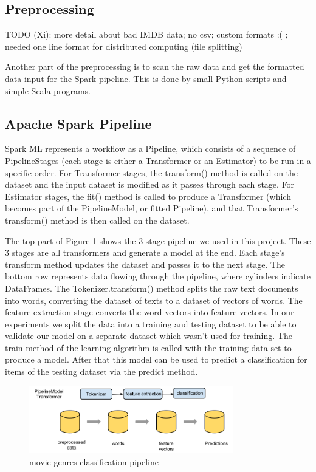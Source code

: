 \documentclass{vldb}
\begin{document}
\subsection{Preprocessing}
\par TODO (Xi): more detail about bad IMDB data; no csv; custom formats :( ; needed one line format for distributed computing (file splitting)
\par Another part of the preprocessing is to scan the raw data and get the formatted data input for the Spark pipeline. This is done by small Python scripts and simple Scala programs.


\subsection{Apache Spark Pipeline}
\par Spark ML\cite{sparkml} represents a workflow as a Pipeline, which consists of a sequence of PipelineStages (each stage is either a Transformer or an Estimator) to be run in a specific order. For Transformer stages, the transform() method is called on the dataset and the input dataset is modified as it passes through each stage. For Estimator stages, the fit() method is called to produce a Transformer (which becomes part of the PipelineModel, or fitted Pipeline), and that Transformer's transform() method is then called on the dataset.
\par The top part of Figure \ref{fig:pipeline} shows the 3-stage pipeline we used in this project. These 3 stages are all transformers and generate a model at the end. Each stage's transform method updates the dataset and passes it to the next stage. The bottom row represents data flowing through the pipeline, where cylinders indicate DataFrames. The Tokenizer.transform() method splits the raw text documents into words, converting the dataset of texts to a dataset of vectors of words. The feature extraction stage converts the word vectors into feature vectors. In our experiments we split the data into a training and testing dataset to be able to validate our model on a separate dataset which wasn't used for training. The train method of the learning algorithm is called with the training data set to produce a model. After that this model can be used to predict a classification for items of the testing dataset via the predict method.
\begin{figure}
\begin{center}
\includegraphics[width=3.50in]{pipeline.png}
\caption{movie genres classification pipeline}
\label{fig:pipeline}
\end{center}
\end{figure}
\end{document}
